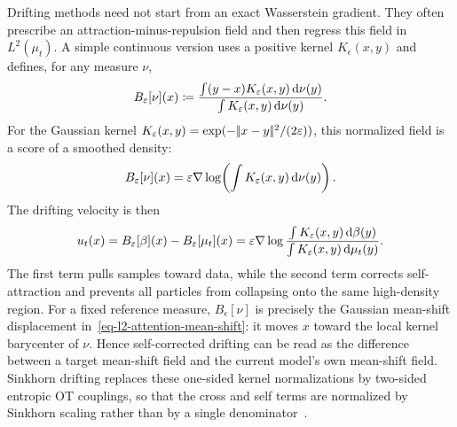 Drifting methods need not start from an exact Wasserstein gradient. They often prescribe an attraction-minus-repulsion field and then regress this field in $L^2(\mu_t)$. A simple continuous version uses a positive kernel $K_\epsilon(x,y)$ and defines, for any measure $\nu$,
\begin{equation}\label{eq-normalized-kernel-drift}
	B_\varepsilon[\nu](x)
	\coloneqq
	\frac{\int (y-x)K_\varepsilon(x,y)\,\mathrm{d}\nu(y)}
	     {\int K_\varepsilon(x,y)\,\mathrm{d}\nu(y)}.
\end{equation}
For the Gaussian kernel
$K_\varepsilon(x,y)=\exp(-|\!| x-y |\!|^2/(2\varepsilon))$, this normalized field is a score of a smoothed density:
\begin{equation}\label{eq-normalized-kernel-score}
	B_\varepsilon[\nu](x)
	=
	\varepsilon\nabla\log\!\left(\int K_\varepsilon(x,y)\,\mathrm{d}\nu(y)\right).
\end{equation}
The drifting velocity is then
\begin{equation}\label{eq-cross-minus-self-drift}
	u_t(x)=B_\varepsilon[\beta](x)-B_\varepsilon[\mu_t](x)
	=
	\varepsilon\nabla\log
	\frac{\int K_\varepsilon(x,y)\,\mathrm{d}\beta(y)}
	     {\int K_\varepsilon(x,y)\,\mathrm{d}\mu_t(y)}.
\end{equation}
The first term pulls samples toward data, while the second term corrects self-attraction and prevents all particles from collapsing onto the same high-density region. For a fixed reference measure, \(B_\epsilon[\nu]\) is precisely the Gaussian mean-shift displacement in~\eqref{eq-l2-attention-mean-shift}: it moves $x$ toward the local kernel barycenter of $\nu$. Hence self-corrected drifting can be read as the difference between a target mean-shift field and the current model's own mean-shift field. Sinkhorn drifting replaces these one-sided kernel normalizations by two-sided entropic OT couplings, so that the cross and self terms are normalized by Sinkhorn scaling rather than by a single denominator~\cite{He2026SinkhornDrifting}.

